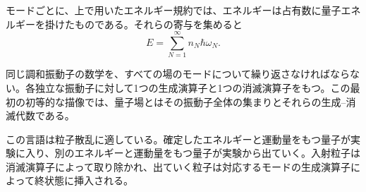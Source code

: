 モードごとに、上で用いたエネルギー規約では、エネルギーは占有数に量子エネルギーを掛けたものである。それらの寄与を集めると
\begin{equation}
E=\sum_{N=1}^{\infty} n_N\hbar\omega_N.
\end{equation}

同じ調和振動子の数学を、すべての場のモードについて繰り返さなければならない。各独立な振動子に対して1つの生成演算子と1つの消滅演算子をもつ。この最初の初等的な描像では、量子場とはその振動子全体の集まりとそれらの生成--消滅代数である。

この言語は粒子散乱に適している。確定したエネルギーと運動量をもつ量子が実験に入り、別のエネルギーと運動量をもつ量子が実験から出ていく。入射粒子は消滅演算子によって取り除かれ、出ていく粒子は対応するモードの生成演算子によって終状態に挿入される。

\begin{classroomqa}
\end{classroomqa}